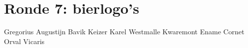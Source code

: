 
\section{Ronde 7: bierlogo's}
\begin{questions}

\question[2] Gregorius
\vspace{5mm}
\question[2] Augustijn
\vspace{5mm}
\question[2] Bavik
\vspace{5mm}
\question[2] Keizer Karel
\vspace{5mm}
\question[2] Westmalle
\vspace{5mm}
\question[2] Kwaremont
\vspace{5mm}
\question[2] Ename
\vspace{5mm}
\question[2] Cornet
\vspace{5mm}
\question[2] Orval
\vspace{5mm}
\question[2] Vicaris

\end{questions}

\newpage
